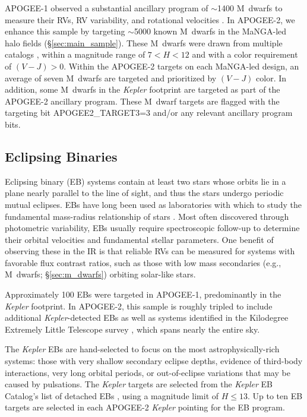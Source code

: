 \documentclass[12pt,twocolumn]{emulateapj}
\begin{document}
APOGEE-1 observed a substantial ancillary program of $\sim$1400 M~dwarfs to measure their RVs, RV variability, and rotational velocities \citep[see \S\,C.4 of Zasowski et al.\ 2013;][]{Deshpande_2013_apogeeMdwarfs}.  In APOGEE-2, we enhance this sample by targeting $\sim$5000 known M~dwarfs in the MaNGA-led halo fields (\S\ref{sec:main_sample}). These M~dwarfs were drawn from multiple catalogs \citep[e.g.,][]{Reid_2005_faintPMstars,Lepine_2005_LSPMNorth,Lepine_2011_Mdwarfcatalog,Gaidos_2014_coolstarcatalog}, within a magnitude range of $7 < H < 12$ and with a color requirement of $(V-J)>0$.  Within the APOGEE-2 targets on each MaNGA-led design, an average of seven M~dwarfs are targeted and prioritized by $(V-J)$ color.
In addition, some M~dwarfs in the {\it Kepler} footprint are targeted as part of the APOGEE-2 ancillary program. 
These M~dwarf targets are flagged with the targeting bit APOGEE2\_TARGET3=3 and/or any relevant ancillary program bits.


\subsection{Eclipsing Binaries}
\label{sec:ebs}

Eclipsing binary (EB) systems contain at least two stars whose orbits lie in a plane nearly parallel to the line of sight, and thus the stars undergo periodic mutual eclipses.  EBs have long been used as laboratories with which to study the fundamental mass-radius relationship of stars \citep{Torres_2010_EBreview}.  Most often discovered through photometric variability, EBs usually require spectroscopic follow-up to determine their orbital velocities and fundamental stellar parameters.  One benefit of observing these in the IR is that reliable RVs can be measured for 
systems with favorable flux contrast ratios, such as those with low mass secondaries (e.g., M~dwarfs; \S\ref{sec:m_dwarfs}) orbiting solar-like stars.

Approximately 100 EBs were targeted in APOGEE-1, predominantly in the {\it Kepler} footprint.  In APOGEE-2, this sample is roughly tripled to include additional {\it Kepler}-detected EBs as well as systems identified in the Kilodegree Extremely Little Telescope survey \citep[KELT;][]{Pepper_2007_KELT,Pepper_2012_KELTsouth}, which spans nearly the entire sky.  

The {\it Kepler} EBs are hand-selected to focus on the most
astrophysically-rich systems: those with very shallow secondary eclipse depths,
evidence of third-body interactions, very long orbital periods, or out-of-eclipse variations that may be caused by pulsations.  The {\it Kepler} targets
are selected from the {\it Kepler} EB Catalog’s list of detached EBs
\citep{Prsa_2011_keplerEBs,Slawson_2011_keplerEBs}, using a magnitude limit of $H \leq 13$.  Up to ten EB targets are selected in each APOGEE-2 {\it Kepler} pointing for the EB program.
\end{document}
